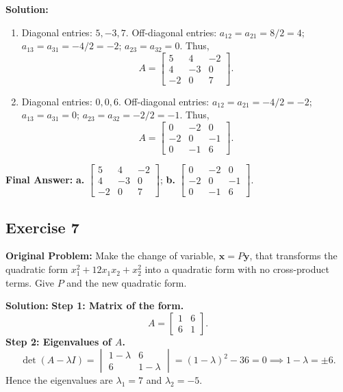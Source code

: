 \documentclass[11pt, letterpaper]{article}
\theoremstyle{definition}
\theoremstyle{remark}
\begin{document}
\textbf{Solution:}
\begin{enumerate}[label=\alph*.]
    \item Diagonal entries: $5, -3, 7$. Off-diagonal entries: $a_{12} = a_{21} = 8/2 = 4$; $a_{13} = a_{31} = -4/2 = -2$; $a_{23} = a_{32} = 0$. Thus,
    \[
    A = \begin{bmatrix} 5 & 4 & -2 \\ 4 & -3 & 0 \\ -2 & 0 & 7 \end{bmatrix}.
    \]
    \item Diagonal entries: $0, 0, 6$. Off-diagonal entries: $a_{12} = a_{21} = -4/2 = -2$; $a_{13} = a_{31} = 0$; $a_{23} = a_{32} = -2/2 = -1$. Thus,
    \[
    A = \begin{bmatrix} 0 & -2 & 0 \\ -2 & 0 & -1 \\ 0 & -1 & 6 \end{bmatrix}.
    \]
\end{enumerate}
\textbf{Final Answer:} \textbf{a.} $\begin{bmatrix} 5 & 4 & -2 \\ 4 & -3 & 0 \\ -2 & 0 & 7 \end{bmatrix}$; \quad \textbf{b.} $\begin{bmatrix} 0 & -2 & 0 \\ -2 & 0 & -1 \\ 0 & -1 & 6 \end{bmatrix}$.

\hrulefill

\subsection*{Exercise 7}
\textbf{Original Problem:} Make the change of variable, $\mathbf{x} = P\mathbf{y}$, that transforms the quadratic form $x_1^2 + 12x_1x_2 + x_2^2$ into a quadratic form with no cross-product terms. Give $P$ and the new quadratic form.

\textbf{Solution:}
\textbf{Step 1: Matrix of the form.}
\[
A = \begin{bmatrix} 1 & 6 \\ 6 & 1 \end{bmatrix}.
\]
\textbf{Step 2: Eigenvalues of $A$.}
\[
\det(A - \lambda I) = \begin{vmatrix} 1 - \lambda & 6 \\ 6 & 1 - \lambda \end{vmatrix} = (1 - \lambda)^2 - 36 = 0 \implies 1 - \lambda = \pm 6.
\]
Hence the eigenvalues are $\lambda_1 = 7$ and $\lambda_2 = -5$.
\end{document}
